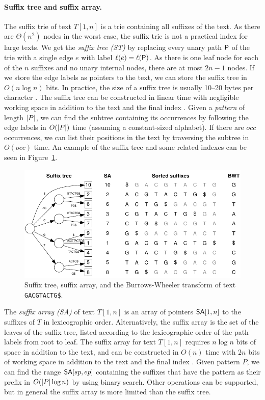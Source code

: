 \paragraph{Suffix tree and suffix array.}

The suffix trie of text $T[1,n]$ is a trie containing all suffixes of the text. As there are $\Theta(n^{2})$ nodes in the worst case, the suffix trie is not a practical index for large texts. We get the \emph{suffix tree (ST)} \cite{Weiner1973} by replacing every unary path $\mathsf{P}$ of the trie with a single edge $e$ with label $\ell(e) = \ell(\mathsf{P})$. As there is one leaf node for each of the $n$ suffixes and no unary internal nodes, there are at most $2n-1$ nodes. If we store the edge labels as pointers to the text, we can store the suffix tree in $O(n \log n)$ bits. In practice, the size of a suffix tree is usually 10--20 bytes per character \cite{Kurtz1999}. The suffix tree can be constructed in linear time with negligible working space in addition to the text and the final index \cite{McCreight1976,Ukkonen1995}. Given a \emph{pattern} of length $\lvert P \rvert$, we can find the subtree containing its occurrences by following the edge labels in $O(\lvert P \rvert)$ time (assuming a constant-sized alphabet). If there are $occ$ occurrences, we can list their positions in the text by traversing the subtree in $O(occ)$ time. An example of the suffix tree and some related indexes can be seen in Figure~\ref{fig:suffix structures}.

\begin{figure}
\centerline{\includegraphics{figures/indexes.pdf}}
\caption{Suffix tree, suffix array, and the Burrows-Wheeler transform of text \texttt{GACGTACTG\$}.}
\label{fig:suffix structures}
\end{figure}

\newpage The \emph{suffix array (SA)} \cite{Manber1993,Gonnet1992} of text $T[1,n]$ is an array of pointers $\mathsf{SA}[1,n]$ to the suffixes of $T$ in lexicographic order. Alternatively, the suffix array is the set of the leaves of the suffix tree, listed according to the lexicographic order of the path labels from root to leaf. The suffix array for text $T[1,n]$ requires $n \log n$ bits of space in addition to the text, and can be constructed in $O(n)$ time with $2n$ bits of working space in addition to the text and the final index \cite{Nong2009}. Given pattern $P$, we can find the range $\mathsf{SA}[sp,ep]$ containing the suffixes that have the pattern as their prefix in $O(\lvert P \rvert \log n)$ by using binary search. Other operations can be supported, but in general the suffix array is more limited than the suffix tree.

